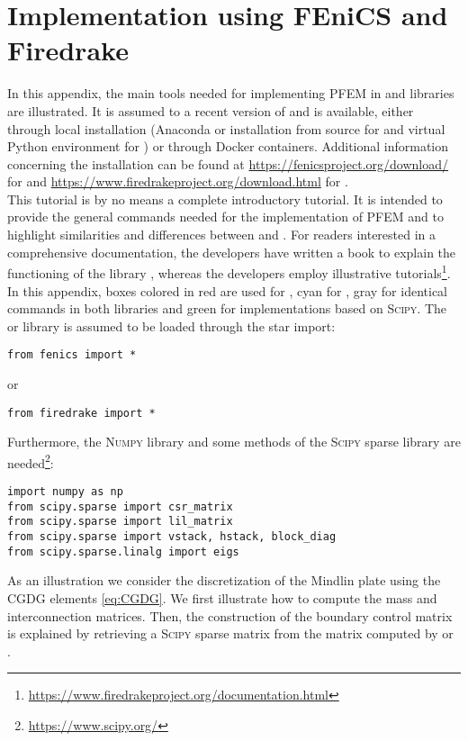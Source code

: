\chapter{Implementation using FEniCS and Firedrake}

In this appendix, the main tools needed for implementing PFEM  in \fenics and \firedrake libraries are illustrated. It is assumed to a recent version of \fenics and \firedrake is available, either through local installation (Anaconda or installation from source for \fenics and virtual Python environment for \firedrake) or through Docker containers. Additional information concerning the installation can be found at \url{https://fenicsproject.org/download/} for \fenics and \url{https://www.firedrakeproject.org/download.html} for \firedrake. \\

This tutorial is by no means a complete introductory tutorial. It is intended to provide the general commands needed for the implementation of PFEM and to highlight similarities and differences between \fenics and \firedrake. For readers interested in a comprehensive documentation, the \fenics developers have written a book to explain the functioning of the library \cite{logg2012}, whereas the \firedrake developers employ illustrative tutorials\footnote{\url{https://www.firedrakeproject.org/documentation.html}}. \\

In this appendix, boxes colored in red are used for \textcolor{red}{\fenics}, cyan for \textcolor{cyan}{\firedrake}, gray for identical commands in both libraries and green for implementations based on \textsc{Scipy}. The \fenics or \firedrake library is assumed to be loaded through the star import:	
\begin{verbatim}
from fenics import *
\end{verbatim}
or
\begin{verbatim}
from firedrake import *
\end{verbatim}
Furthermore, the \textsc{Numpy} library and some methods of the \textsc{Scipy} sparse library  are needed\footnote{\url{https://www.scipy.org/}}:
\begin{Verbatim}
import numpy as np
from scipy.sparse import csr_matrix
from scipy.sparse import lil_matrix
from scipy.sparse import vstack, hstack, block_diag
from scipy.sparse.linalg import eigs
\end{Verbatim}
As an illustration we consider the discretization of the Mindlin plate using the CGDG elements  \eqref{eq:CGDG}. We first illustrate how to compute the mass and interconnection matrices. Then, the construction of the boundary control matrix is explained by retrieving a \textsc{Scipy} sparse matrix from the matrix computed by \fenics or \firedrake.


